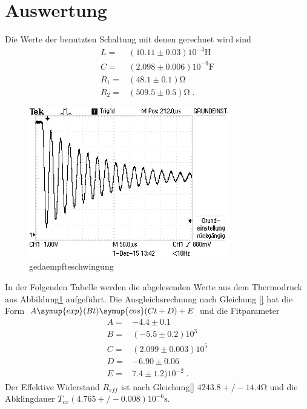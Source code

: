 \section{Auswertung}
\label{sec:Auswertung}
Die Werte der benutzten Schaltung mit denen gerechnet wird sind
\begin{align*}
  L=&(10.11\pm0.03)10^{-3}\si{\henry}\\
  C=&(2.098\pm0.006)10^{-9}\si{\farad}\\
  R_1=&(48.1\pm0.1)\si{\ohm}\\
  R_2=&(509.5\pm0.5)\si{\ohm}\;.
\end{align*}
\begin{figure}
  \centering
  \includegraphics[width=0.78\textwidth]{Thermodruck.JPG}
  \caption{gedaempfteschwingung}
  \label{fig:termodruck}
\end{figure}
In der Folgenden Tabelle werden die abgelesenden Werte aus dem Thermodruck
aus Abbildung\ref{fig:termodruck} aufgeführt. Die Ausgleichsrechnung nach Gleichung
\eqref{} hat die Form $A\symup{exp}(Bt)\symup{cos}(Ct+D)+E$ und die Fitparameter
\begin{align*}
  A=&-4.4\pm0.1  \\
  B=&(-5.5\pm0.2)10^3  \\
  C=&(2.099\pm0.003)10^5   \\
  D=&-6.90\pm0.06  \\
  E=&7.4\pm1.2)10^{-2}\;.
\end{align*}
Der Effektive Widerstand $R_{eff}$ ist nach Gleichung\eqref{}
$4243.8+/-14.4\si{\ohm}$ und die Abklingdauer $T_{ex}(4.765+/-0.008)10^{-6}\si{\second}$.
